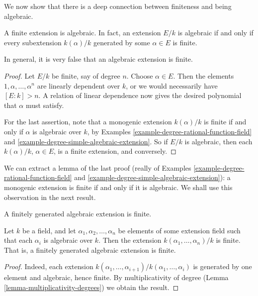 \noindent
We now show that there is a deep connection between finiteness and being
algebraic.

\begin{lemma}
\label{lemma-finite-is-algebraic}
A finite extension is algebraic. In fact, an extension $E/k$ is algebraic
if and only if every subextension $k(\alpha)/k$ generated by some
$\alpha \in E$ is finite.
\end{lemma}

\noindent
In general, it is very false that an algebraic extension is finite.

\begin{proof}
Let $E/k$ be finite, say of degree $n$. Choose $\alpha \in E$. Then the
elements $1, \alpha, \ldots, \alpha^n$ are linearly
dependent over $k$, or we would necessarily have $[E : k] > n$. A relation of
linear dependence now gives the desired polynomial that $\alpha$ must satisfy.

\medskip\noindent
For the last assertion, note that a monogenic extension $k(\alpha)/k$ is
finite if and only if $\alpha$ is algebraic over $k$, by
Examples \ref{example-degree-rational-function-field} and
\ref{example-degree-simple-algebraic-extension}.
So if $E/k$ is algebraic, then each $k(\alpha)/k$, $\alpha \in E$, is a finite
extension, and conversely.
\end{proof}

\noindent
We can extract a lemma of the last proof (really of
Examples \ref{example-degree-rational-function-field} and
\ref{example-degree-simple-algebraic-extension}):
a monogenic extension is finite if and only if it is algebraic.
We shall use this observation in the next result.

\begin{lemma}
\label{lemma-algebraic-finitely-generated}
\begin{slogan}
A finitely generated algebraic extension is finite.
\end{slogan}
Let $k$ be a field, and let $\alpha_1, \alpha_2, \ldots, \alpha_n$ be elements
of some extension field such that each $\alpha_i$ is algebraic over $k$. Then
the extension $k(\alpha_1, \ldots, \alpha_n)/k$ is finite.
That is, a finitely generated algebraic extension is finite.
\end{lemma}

\begin{proof}
Indeed, each extension
$k(\alpha_{1}, \ldots, \alpha_{i+1})/k(\alpha_1, \ldots, \alpha_{i})$
is generated by one element and algebraic, hence finite.
By multiplicativity of degree (Lemma \ref{lemma-multiplicativity-degrees})
we obtain the result.
\end{proof}

